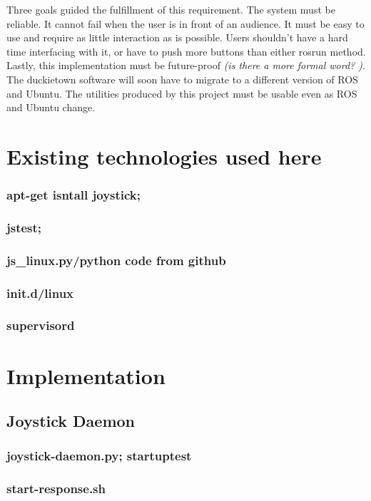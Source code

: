 \documentclass{article}
\begin{document}
Three goals guided the fulfillment of this requirement. The system must be reliable. It cannot fail when the user is in front of an audience. It must be easy to use and require as little interaction as is possible. Users shouldn't have a hard time interfacing with it, or have to push more buttons than either rosrun method. Lastly, this implementation must be future-proof \textit{(is there a more formal word? )}. The duckietown software will soon have to migrate to a different version of ROS and Ubuntu. The utilities produced by this project must be usable even as ROS and Ubuntu change. 
\section{Existing technologies used here}
\subsubsection{apt-get isntall joystick; }
\subsubsection{jstest; }
\subsubsection{js\_linux.py/python code from github}
\subsubsection{init.d/linux}
\subsubsection{supervisord}
\section{Implementation}
\subsection{Joystick Daemon}
\subsubsection{joystick-daemon.py; startuptest}
\subsubsection{start-response.sh}
\end{document}
